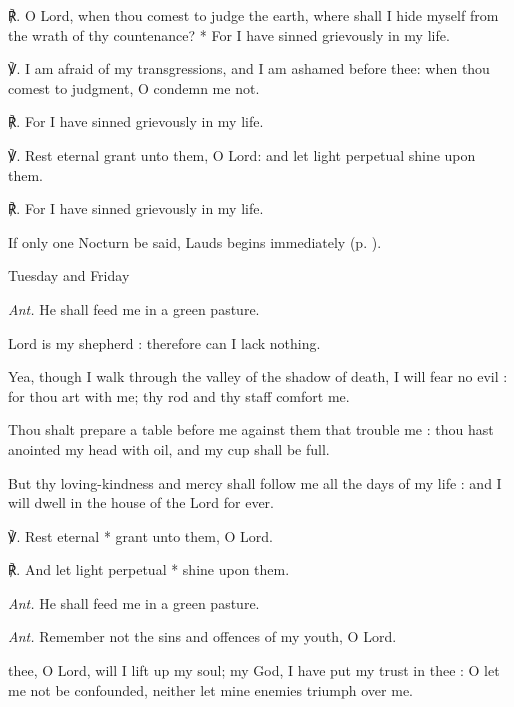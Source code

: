℟. O Lord, {\dag} when thou comest to judge the earth, where shall I hide myself from the wrath of thy countenance? * For I have sinned grievously in my life.\par
℣. I am afraid of my transgressions, and I am ashamed before thee: when thou comest to judgment, O condemn me not.\par
℟. For I have sinned grievously in my life.\par
℣. Rest eternal grant unto them, O Lord: and let light perpetual shine upon them.\par
℟. For I have sinned grievously in my life.
\begin{rubric}
    {If only one Nocturn be said, Lauds begins immediately (p. \pageref{laudsdead}).}
\end{rubric}
\begin{inhead}
    {Tuesday and Friday}
\end{inhead}
\par\noindent
\textit{Ant.} He shall feed me {\dag} in a green pasture.\par
{} Lord is my shepherd : therefore can I lack nothing.\par
{}
Yea, though I walk through the valley of the shadow of death, I will fear no evil : for thou art with me; thy rod and thy staff comfort me.\par
{}Thou shalt prepare a table before me against them that trouble me : thou hast anointed my head with oil, and my cup shall be full.\par
{}But thy loving-kindness and mercy shall follow me all the days of my life : and I will dwell in the house of the Lord for ever.\par
℣. Rest eternal * grant unto them, O Lord.\par
℟. And let light perpetual * shine upon them.\par\noindent
\textit{Ant.} He shall feed me in a green pasture.\par
{}\par\noindent
\textit{Ant.} Remember not {\dag} the sins and offences of my youth, O Lord.\par
{} thee, O Lord, will I lift up my soul; my God, I have put my trust in thee : O let me not be confounded, neither let mine enemies triumph over me.\par
